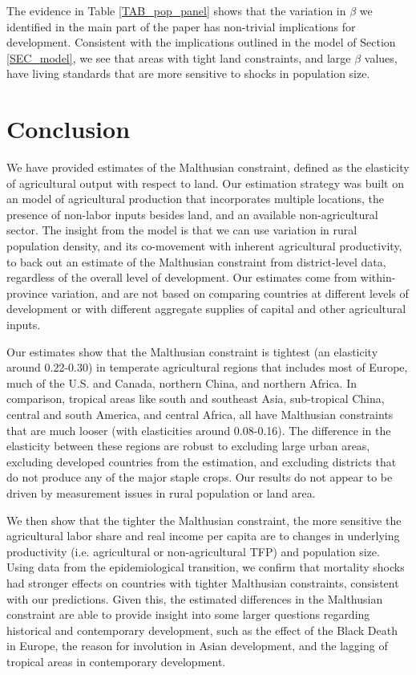 \documentclass[11pt]{article}
\begin{document}
The evidence in Table \ref{TAB_pop_panel} shows that the variation in $\beta$ we identified in the main part of the paper has non-trivial implications for development. Consistent with the implications outlined in the model of Section \ref{SEC_model}, we see that areas with tight land constraints, and large $\beta$ values, have living standards that are more sensitive to shocks in population size. 

\section{Conclusion}
We have provided estimates of the Malthusian constraint, defined as the elasticity of agricultural output with respect to land. Our estimation strategy was built on an model of agricultural production that incorporates multiple locations, the presence of non-labor inputs besides land, and an available non-agricultural sector. The insight from the model is that we can use variation in rural population density, and its co-movement with inherent agricultural productivity, to back out an estimate of the Malthusian constraint from district-level data, regardless of the overall level of development. Our estimates come from within-province variation, and are not based on comparing countries at different levels of development or with different aggregate supplies of capital and other agricultural inputs.

Our estimates show that the Malthusian constraint is tightest (an elasticity around 0.22-0.30) in temperate agricultural regions that includes most of Europe, much of the U.S. and Canada, northern China, and northern Africa. In comparison, tropical areas like south and southeast Asia, sub-tropical China, central and south America, and central Africa, all have Malthusian constraints that are much looser (with elasticities around 0.08-0.16). The difference in the elasticity between these regions are robust to excluding large urban areas, excluding developed countries from the estimation, and excluding districts that do not produce any of the major staple crops. Our results do not appear to be driven by measurement issues in rural population or land area.

We then show that the tighter the Malthusian constraint, the more sensitive the agricultural labor share and real income per capita are to changes in underlying productivity (i.e. agricultural or non-agricultural TFP) and population size. Using data from the epidemiological transition, we confirm that mortality shocks had stronger effects on countries with tighter Malthusian constraints, consistent with our predictions. Given this, the estimated differences in the Malthusian constraint are able to provide insight into some larger questions regarding historical and contemporary development, such as the effect of the Black Death in Europe, the reason for involution in Asian development, and the lagging of tropical areas in contemporary development. 
\end{document}
